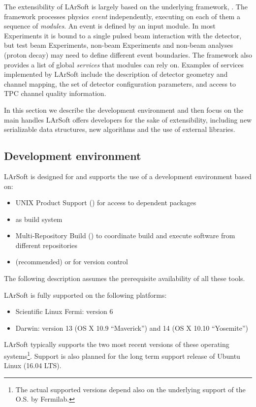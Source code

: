 
The extensibility of LArSoft is largely based on the underlying
framework, \ART. The \ART framework processes physics \emph{event}
independently, executing on each of them a sequence of \emph{modules}.
An event is defined by an input module.
In most Experiments it is bound to a single pulsed beam interaction with the detector,
but test beam Experiments, non-beam Experiments and non-beam analyses (\eg proton decay)
may need to define different event boundaries.
The framework also provides a list of global \emph{services} that modules can rely on.
Examples of services implemented by LArSoft include
the description of detector geometry and channel mapping,
the set of detector configuration parameters,
and access to TPC channel quality information.

In this section we describe the development environment
and then focus on the main handles LArSoft offers developers for the sake of extensibility,
including new serializable data structures, new algorithms
and the use of external libraries.


\subsection{Development environment}
\label{ssec:Development:Environment}

LArSoft is designed for and supports the use of a development environment based on:
\begin{itemize}
   \item UNIX Product Support (\UPS) for access to dependent packages
   \item \cetbuildtools\cite{cetbuildtools} as build system
   \item Multi-Repository Build\cite{MRB} (\MRB)  to coordinate build and execute software from different repositories
   \item \git (recommended) or \SVN for version control
\end{itemize}
The following description assumes the prerequisite availability of all these tools.

LArSoft is fully supported on the following platforms:
\begin{itemize}
   \item Scientific Linux Fermi: version 6
   \item Darwin: version 13 (OS X 10.9 ``Maverick'') and 14 (OS X 10.10 ``Yosemite'')
\end{itemize}
LArSoft typically supports the two most recent versions of these operating systems\footnote{
The actual supported versions depend also on the underlying support of the O.S. by Fermilab.
}.
Support is also planned for the long term support release of Ubuntu Linux (16.04 LTS).

